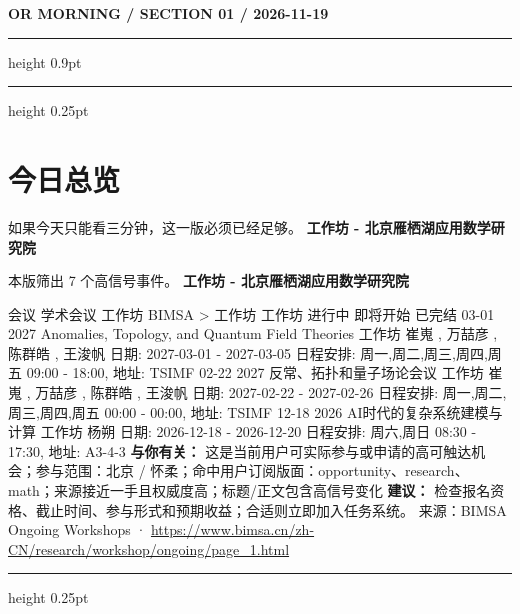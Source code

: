 \documentclass[10.5pt]{ctexart}
\begin{document}
{\small\bfseries OR MORNING / SECTION 01 / 2026-11-19}
\vspace{2mm}
\hrule height 0.9pt
\vspace{1.5mm}
\hrule height 0.25pt
\vspace{4mm}
\section*{今日总览}
{\color{ormuted} 如果今天只能看三分钟，这一版必须已经足够。}
\vspace{2mm}
{\fontsize{25}{29}\selectfont\bfseries 工作坊 - 北京雁栖湖应用数学研究院}\par
\vspace{2mm}
{\large 本版筛出 7 个高信号事件。}
\vspace{3mm}
{\Large\bfseries 工作坊 - 北京雁栖湖应用数学研究院}\par
会议 学术会议 工作坊 BIMSA > 工作坊 工作坊 进行中 即将开始 已完结 03-01 2027 Anomalies, Topology, and Quantum Field Theories 工作坊 崔嵬 , 万喆彦 , 陈群皓 , 王浚帆 日期: 2027-03-01 - 2027-03-05 日程安排: 周一,周二,周三,周四,周五 09:00 - 18:00, 地址: TSIMF 02-22 2027 反常、拓扑和量子场论会议 工作坊 崔嵬 , 万喆彦 , 陈群皓 , 王浚帆 日期: 2027-02-22 - 2027-02-26 日程安排: 周一,周二,周三,周四,周五 00:00 - 00:00, 地址: TSIMF 12-18 2026 AI时代的复杂系统建模与计算 工作坊 杨朔 日期: 2026-12-18 - 2026-12-20 日程安排: 周六,周日 08:30 - 17:30, 地址: A3-4-3
\textbf{与你有关：} 这是当前用户可实际参与或申请的高可触达机会；参与范围：北京 / 怀柔；命中用户订阅版面：opportunity、research、math；来源接近一手且权威度高；标题/正文包含高信号变化
\textbf{建议：} 检查报名资格、截止时间、参与形式和预期收益；合适则立即加入任务系统。
{\footnotesize\color{ormuted} 来源：BIMSA Ongoing Workshops · \url{https://www.bimsa.cn/zh-CN/research/workshop/ongoing/page_1.html}}
\vspace{3mm}
\hrule height 0.25pt
\vspace{3mm}
\end{document}
